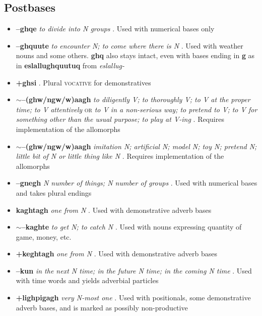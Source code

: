 \documentclass{article}
\begin{document}
\subsection{Postbases}
\begin{itemize}
\item \textbf{--ghqe} \textit{to divide into N groups} . Used with numerical bases only

\item \textbf{--ghquute} \textit{to encounter N; to come where there is N} . Used with weather nouns and some others. \textbf{ghq} also stays intact, even with bases ending in \textbf{g} as in \textbf{eslallughquutuq} from \textit{eslallug-}

\item \textbf{+ghsi} . Plural \textsc{vocative} for demonstratives

\item \textbf{$\sim$--(ghw/ngw/w)aagh} \textit{to diligently V; to thoroughly V; to V at the proper time; to V attentively} \textsc{or} \textit{to V in a non-serious way; to pretend to V; to V for something other than the usual purpose; to play at V-ing} . Requires implementation of the allomorphs

\item \textbf{$\sim$--(ghw/ngw/w)aagh} \textit{imitation N; artificial N; model N; toy N; pretend N; little bit of N or little thing like N} . Requires implementation of the allomorphs

\item \textbf{--gnegh} \textit{N number of things; N number of groups} . Used with numerical bases and takes plural endings

\item \textbf{kaghtagh} \textit{one from N} . Used with demonstrative adverb bases

\item \textbf{$\sim$--kaghte} \textit{to get N; to catch N} . Used with nouns expressing quantity of game, money, etc.

\item \textbf{+keghtagh} \textit{one from N} . Used with  demonstrative adverb bases

\item \textbf{--kun} \textit{in the next N time; in the future N time; in the coming N time} . Used with time words and  yields adverbial particles

\item \textbf{+lighpigagh} \textit{very N-most one} . Used with positionals, some demonstrative adverb bases, and is marked as possibly non-productive


\end{itemize}
\end{document}
